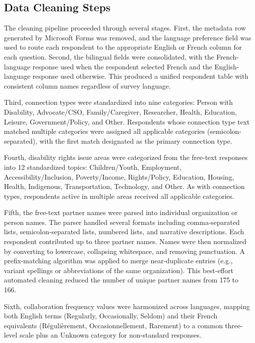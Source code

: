 \documentclass[
  letterpaper,
  DIV=11,
  numbers=noendperiod]{scrartcl}
\begin{document}
\subsection{Data Cleaning Steps}\label{data-cleaning-steps}

The cleaning pipeline proceeded through several stages. First, the
metadata row generated by Microsoft Forms was removed, and the language
preference field was used to route each respondent to the appropriate
English or French column for each question. Second, the bilingual fields
were consolidated, with the French-language response used when the
respondent selected French and the English-language response used
otherwise. This produced a unified respondent table with consistent
column names regardless of survey language.

Third, connection types were standardized into nine categories: Person
with Disability, Advocate/CSO, Family/Caregiver, Researcher, Health,
Education, Leisure, Government/Policy, and Other. Respondents whose
connection type text matched multiple categories were assigned all
applicable categories (semicolon-separated), with the first match
designated as the primary connection type.

Fourth, disability rights issue areas were categorized from the
free-text responses into 12 standardized topics: Children/Youth,
Employment, Accessibility/Inclusion, Poverty/Income, Rights/Policy,
Education, Housing, Health, Indigenous, Transportation, Technology, and
Other. As with connection types, respondents active in multiple areas
received all applicable categories.

Fifth, the free-text partner names were parsed into individual
organization or person names. The parser handled several formats
including comma-separated lists, semicolon-separated lists, numbered
lists, and narrative descriptions. Each respondent contributed up to
three partner names. Names were then normalized by converting to
lowercase, collapsing whitespace, and removing punctuation. A
prefix-matching algorithm was applied to merge near-duplicate entries
(e.g., variant spellings or abbreviations of the same organization).
This best-effort automated cleaning reduced the number of unique partner
names from 175 to 166.

Sixth, collaboration frequency values were harmonized across languages,
mapping both English terms (Regularly, Occasionally, Seldom) and their
French equivalents (Régulièrement, Occasionnellement, Rarement) to a
common three-level scale plus an Unknown category for non-standard
responses.
\end{document}
